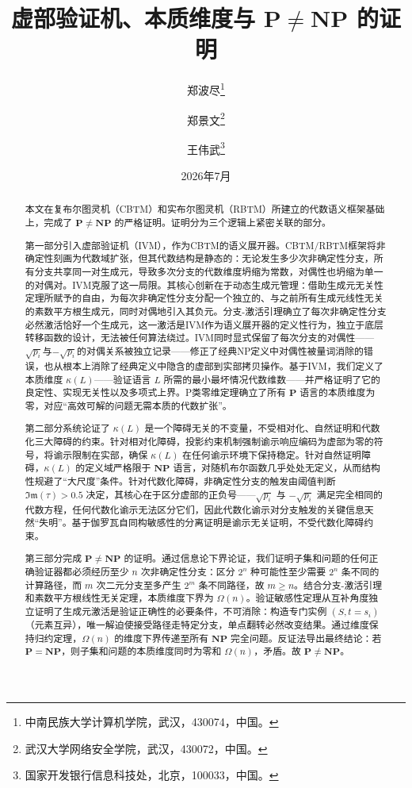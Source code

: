 \documentclass{ctexart}
\begin{document}
	
	\title{\bfseries 虚部验证机、本质维度与 $\mathbf{P} \neq \mathbf{NP}$ 的证明}
	\author{郑波尽\thanks{中南民族大学计算机学院，武汉，430074，中国。}
		\and 郑景文\thanks{武汉大学网络安全学院，武汉，430072，中国。}
		\and 王伟武\thanks{国家开发银行信息科技处，北京，100033，中国。}}
	\date{2026年7月}
	
	\maketitle
	
	\begin{abstract}
		本文在复布尔图灵机（CBTM）和实布尔图灵机（RBTM）所建立的代数语义框架基础上，完成了 $\mathbf{P} \neq \mathbf{NP}$ 的严格证明。证明分为三个逻辑上紧密关联的部分。
		
		第一部分引入虚部验证机（IVM），作为CBTM的语义展开器。CBTM/RBTM框架将非确定性刻画为代数域扩张，但其代数结构是静态的：无论发生多少次非确定性分支，所有分支共享同一对生成元，导致多次分支的代数维度坍缩为常数，对偶性也坍缩为单一的对偶对。IVM克服了这一局限。其核心创新在于动态生成元管理：借助生成元无关性定理所赋予的自由，为每次非确定性分支分配一个独立的、与之前所有生成元线性无关的素数平方根生成元，同时对偶地引入其负元。分支-激活引理确立了每次非确定性分支必然激活恰好一个生成元，这一激活是IVM作为语义展开器的定义性行为，独立于底层转移函数的设计，无法被任何算法绕过。IVM同时显式保留了每次分支的对偶性——$\sqrt{p_i}$与$-\sqrt{p_i}$的对偶关系被独立记录——修正了经典NP定义中对偶性被量词消除的错误，也从根本上消除了经典定义中隐含的虚部到实部拷贝操作。基于IVM，我们定义了本质维度 $\kappa(L)$——验证语言 $L$ 所需的最小最坏情况代数维数——并严格证明了它的良定性、实现无关性以及多项式上界。P类零维定理确立了所有 $\mathbf{P}$ 语言的本质维度为零，对应``高效可解的问题无需本质的代数扩张''。
		
		第二部分系统论证了 $\kappa(L)$ 是一个障碍无关的不变量，不受相对化、自然证明和代数化三大障碍的约束。针对相对化障碍，投影约束机制强制谕示响应编码为虚部为零的符号，将谕示限制在实部，确保 $\kappa(L)$ 在任何谕示环境下保持稳定。针对自然证明障碍，$\kappa(L)$ 的定义域严格限于 $\mathbf{NP}$ 语言，对随机布尔函数几乎处处无定义，从而结构性规避了``大尺度''条件。针对代数化障碍，非确定性分支的触发由阈值判断 $\mathfrak{Im}(\tau) > 0.5$ 决定，其核心在于区分虚部的正负号——$\sqrt{p_i}$ 与 $-\sqrt{p_i}$ 满足完全相同的代数方程，任何代数化谕示无法区分它们，因此代数化谕示对分支触发的关键信息天然``失明''。基于伽罗瓦自同构敏感性的分离证明是谕示无关证明，不受代数化障碍约束。
		
		第三部分完成 $\mathbf{P} \neq \mathbf{NP}$ 的证明。通过信息论下界论证，我们证明子集和问题的任何正确验证器都必须经历至少 $n$ 次非确定性分支：区分 $2^n$ 种可能性至少需要 $2^n$ 条不同的计算路径，而 $m$ 次二元分支至多产生 $2^m$ 条不同路径，故 $m \ge n$。结合分支-激活引理和素数平方根线性无关定理，本质维度下界为 $\Omega(n)$。验证敏感性定理从互补角度独立证明了生成元激活是验证正确性的必要条件，不可消除：构造专门实例 $(S, t=s_i)$（元素互异），唯一解迫使接受路径走特定分支，单点翻转必然改变结果。通过维度保持归约定理，$\Omega(n)$ 的维度下界传递至所有 $\mathbf{NP}$ 完全问题。反证法导出最终结论：若 $\mathbf{P} = \mathbf{NP}$，则子集和问题的本质维度同时为零和 $\Omega(n)$，矛盾。故 $\mathbf{P} \neq \mathbf{NP}$。
		

\end{abstract}
\end{document}

